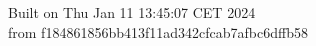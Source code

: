 {\noindent Built on Thu Jan 11 13:45:07 CET 2024} \\ 
 {\noindent from f184861856bb413f11ad342cfcab7afbc6dffb58}
